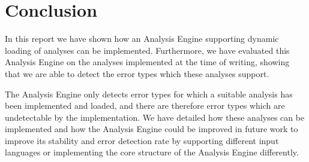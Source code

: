 \section{Conclusion}

In this report we have shown how an Analysis Engine supporting dynamic loading of analyses can be implemented. Furthermore, we have evaluated this Analysis Engine on the analyses implemented at the time of writing, showing that we are able to detect the error types which these analyses support. 

\newpar The Analysis Engine only detects error types for which a suitable analysis has been implemented and loaded, and there are therefore error types which are undetectable by the implementation. We have detailed how these analyses can be implemented and how the Analysis Engine could be improved in future work to improve its stability and error detection rate by supporting different input languages or implementing the core structure of the Analysis Engine differently.